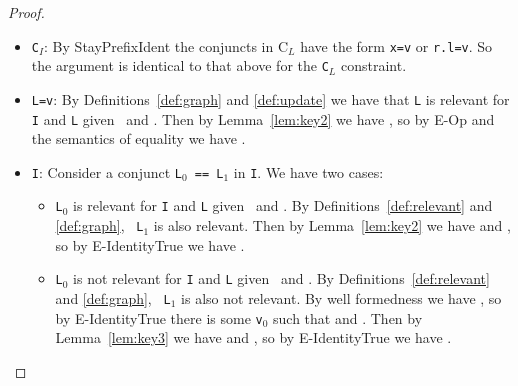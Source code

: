 \begin{proof}
\begin{itemize}
\begin{itemize}
\item {\tt r.l=v}:  Then the relevant update maps {\tt r.l} to some {\tt
    v$'$} $\neq$ {\tt v} in {\tt \Huid$'$}.  But by {\sc Solve} and
  Lemma~\ref{lem:key1} any solution to  the constraint {\tt C$'$
    $\wedge$ C$_{E}$ $\wedge$ C$_{H}$} must map {\tt r.l} to {\tt v$'$}
  in the environment, which violates the constraint {\tt r.l=v}.  So there must be no solution to the constraints,
  contradicting our assumption of satisfiability.
\end{itemize}

\item {\tt C$_I$}:  By {\sc StayPrefixIdent}  the conjuncts in C$_L$
  have the form {\tt x=v} or {\tt r.l=v}.  So the argument is
  identical to that above for the {\tt C$_L$} constraint.

\item {\tt L=v}:  By Definitions~\ref{def:graph} and \ref{def:update}
  we have that {\tt L} is relevant for {\tt I} and {\tt L} given
  \Euid\ and \Huid.  Then by Lemma~\ref{lem:key2} we have 
, so by {\sc E-Op} and the semantics
of equality we have
.

\item {\tt I}:  Consider a conjunct {\tt L$_0$ == L$_1$} in {\tt I}.
  We have two cases:
\begin{itemize}
\item {\tt L$_0$} is relevant for {\tt I} and {\tt L} given \Euid\ and
  \Huid.  By Definitions~\ref{def:relevant} and \ref{def:graph}, {\tt
    L$_1$} is also relevant.  Then by Lemma~\ref{lem:key2} we have
 and
, so by {\sc E-IdentityTrue} we
have
.

\item {\tt L$_0$} is not relevant for {\tt I} and {\tt L} given \Euid\ and
  \Huid.  By Definitions~\ref{def:relevant} and \ref{def:graph}, {\tt
    L$_1$} is also not relevant.  By well formedness we have
, so by {\sc E-IdentityTrue}
there is some {\tt v$_0$} such that
 and
.
Then by Lemma~\ref{lem:key3} we have
 and
, so by {\sc E-IdentityTrue} we
have
. 
\end{itemize}

\end{itemize}
\end{proof}

